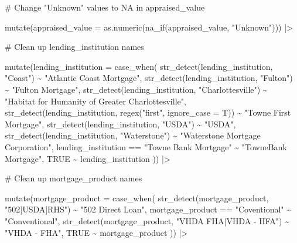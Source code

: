\documentclass[
  letterpaper,
  DIV=11,
  numbers=noendperiod]{scrartcl}
\newenvironment{Shaded}{\begin{snugshade}}{\end{snugshade}}
\newcommand{\AttributeTok}[1]{\textcolor[rgb]{0.40,0.45,0.13}{#1}}
\newcommand{\CommentTok}[1]{\textcolor[rgb]{0.37,0.37,0.37}{#1}}
\newcommand{\ConstantTok}[1]{\textcolor[rgb]{0.56,0.35,0.01}{#1}}
\newcommand{\FunctionTok}[1]{\textcolor[rgb]{0.28,0.35,0.67}{#1}}
\newcommand{\NormalTok}[1]{\textcolor[rgb]{0.00,0.23,0.31}{#1}}
\newcommand{\SpecialCharTok}[1]{\textcolor[rgb]{0.37,0.37,0.37}{#1}}
\newcommand{\StringTok}[1]{\textcolor[rgb]{0.13,0.47,0.30}{#1}}
\begin{document}
\begin{Shaded}
\begin{Highlighting}[]
  \CommentTok{\# Change "Unknown" values to NA in appraised\_value}
  
  \FunctionTok{mutate}\NormalTok{(}\AttributeTok{appraised\_value =} \FunctionTok{as.numeric}\NormalTok{(}\FunctionTok{na\_if}\NormalTok{(appraised\_value, }\StringTok{"Unknown"}\NormalTok{))) }\SpecialCharTok{|\textgreater{}} 
  
  \CommentTok{\# Clean up lending\_institution names}

  \FunctionTok{mutate}\NormalTok{(}\AttributeTok{lending\_institution =} \FunctionTok{case\_when}\NormalTok{(}
    \FunctionTok{str\_detect}\NormalTok{(lending\_institution, }\StringTok{"Coast"}\NormalTok{) }\SpecialCharTok{\textasciitilde{}} \StringTok{"Atlantic Coast Mortgage"}\NormalTok{,}
    \FunctionTok{str\_detect}\NormalTok{(lending\_institution, }\StringTok{"Fulton"}\NormalTok{) }\SpecialCharTok{\textasciitilde{}} \StringTok{"Fulton Mortgage"}\NormalTok{,}
    \FunctionTok{str\_detect}\NormalTok{(lending\_institution, }\StringTok{"Charlottesville"}\NormalTok{) }\SpecialCharTok{\textasciitilde{}} \StringTok{"Habitat for Humanity of Greater Charlottesville"}\NormalTok{,}
    \FunctionTok{str\_detect}\NormalTok{(lending\_institution, }\FunctionTok{regex}\NormalTok{(}\StringTok{"first"}\NormalTok{, }\AttributeTok{ignore\_case =}\NormalTok{ T)) }\SpecialCharTok{\textasciitilde{}} \StringTok{"Towne First Mortgage"}\NormalTok{,}
    \FunctionTok{str\_detect}\NormalTok{(lending\_institution, }\StringTok{"USDA"}\NormalTok{) }\SpecialCharTok{\textasciitilde{}} \StringTok{"USDA"}\NormalTok{,}
    \FunctionTok{str\_detect}\NormalTok{(lending\_institution, }\StringTok{"Waterstone"}\NormalTok{) }\SpecialCharTok{\textasciitilde{}} \StringTok{"Waterstone Mortgage Corporation"}\NormalTok{,}
\NormalTok{    lending\_institution }\SpecialCharTok{==} \StringTok{"Towne Bank Mortgage"} \SpecialCharTok{\textasciitilde{}} \StringTok{"TowneBank Mortgage"}\NormalTok{,}
    \ConstantTok{TRUE} \SpecialCharTok{\textasciitilde{}}\NormalTok{ lending\_institution}
\NormalTok{  )) }\SpecialCharTok{|\textgreater{}} 
  
  \CommentTok{\# Clean up mortgage\_product names}
  
  \FunctionTok{mutate}\NormalTok{(}\AttributeTok{mortgage\_product =} \FunctionTok{case\_when}\NormalTok{(}
    \FunctionTok{str\_detect}\NormalTok{(mortgage\_product, }\StringTok{"502|USDA|RHS"}\NormalTok{) }\SpecialCharTok{\textasciitilde{}} \StringTok{"502 Direct Loan"}\NormalTok{,}
\NormalTok{    mortgage\_product }\SpecialCharTok{==} \StringTok{"Coventional"} \SpecialCharTok{\textasciitilde{}} \StringTok{"Conventional"}\NormalTok{,}
    \FunctionTok{str\_detect}\NormalTok{(mortgage\_product, }\StringTok{"VHDA FHA|VHDA {-} HFA"}\NormalTok{) }\SpecialCharTok{\textasciitilde{}} \StringTok{"VHDA {-} FHA"}\NormalTok{,}
    \ConstantTok{TRUE} \SpecialCharTok{\textasciitilde{}}\NormalTok{ mortgage\_product}
\NormalTok{  )) }\SpecialCharTok{|\textgreater{}} 
  

\end{Highlighting}
\end{Shaded}
\end{document}
